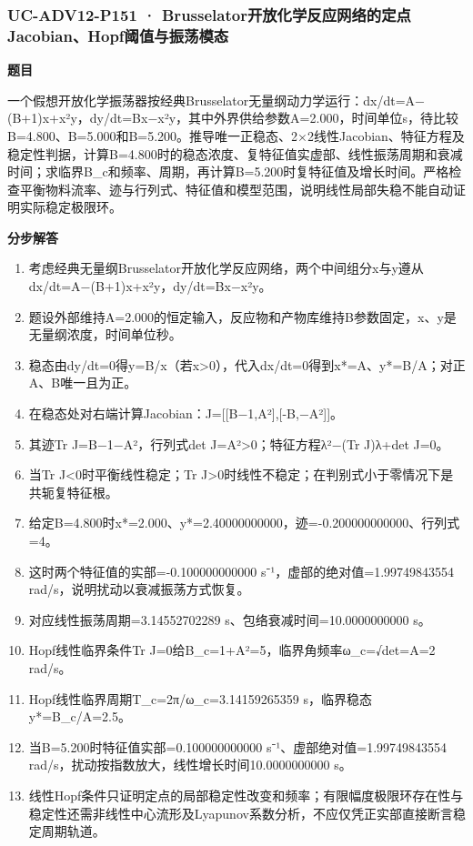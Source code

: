 \documentclass[UTF8,11pt,a4paper]{ctexart}
\begin{document}
\subsubsection*{UC-ADV12-P151 · Brusselator开放化学反应网络的定点Jacobian、Hopf阈值与振荡模态}
\noindent\textbf{题目}\par
一个假想开放化学振荡器按经典Brusselator无量纲动力学运行：dx/dt=A−(B+1)x+x²y，dy/dt=Bx−x²y，其中外界供给参数A=2.000，时间单位s，待比较B=4.800、B=5.000和B=5.200。推导唯一正稳态、2×2线性Jacobian、特征方程及稳定性判据，计算B=4.800时的稳态浓度、复特征值实虚部、线性振荡周期和衰减时间；求临界B\_c和频率、周期，再计算B=5.200时复特征值及增长时间。严格检查平衡物料流率、迹与行列式、特征值和模型范围，说明线性局部失稳不能自动证明实际稳定极限环。\par
\medskip\noindent\textbf{分步解答}
\begin{enumerate}
\item 考虑经典无量纲Brusselator开放化学反应网络，两个中间组分x与y遵从dx/dt=A−(B+1)x+x²y，dy/dt=Bx−x²y。
\item 题设外部维持A=2.000的恒定输入，反应物和产物库维持B参数固定，x、y是无量纲浓度，时间单位秒。
\item 稳态由dy/dt=0得y=B/x（若x>0），代入dx/dt=0得到x*=A、y*=B/A；对正A、B唯一且为正。
\item 在稳态处对右端计算Jacobian：J=[[B−1,A²],[-B,−A²]]。
\item 其迹Tr J=B−1−A²，行列式det J=A²>0；特征方程λ²−(Tr J)λ+det J=0。
\item 当Tr J<0时平衡线性稳定；Tr J>0时线性不稳定；在判别式小于零情况下是共轭复特征根。
\item 给定B=4.800时x*=2.000、y*=2.40000000000，迹=-0.200000000000、行列式=4。
\item 这时两个特征值的实部=-0.100000000000 s⁻¹，虚部的绝对值=1.99749843554 rad/s，说明扰动以衰减振荡方式恢复。
\item 对应线性振荡周期=3.14552702289 s、包络衰减时间=10.0000000000 s。
\item Hopf线性临界条件Tr J=0给B\_c=1+A²=5，临界角频率ω\_c=√det=A=2 rad/s。
\item Hopf线性临界周期T\_c=2π/ω\_c=3.14159265359 s，临界稳态y*=B\_c/A=2.5。
\item 当B=5.200时特征值实部=0.100000000000 s⁻¹、虚部绝对值=1.99749843554 rad/s，扰动按指数放大，线性增长时间10.0000000000 s。
\item 线性Hopf条件只证明定点的局部稳定性改变和频率；有限幅度极限环存在性与稳定性还需非线性中心流形及Lyapunov系数分析，不应仅凭正实部直接断言稳定周期轨道。
\end{enumerate}
\end{document}
